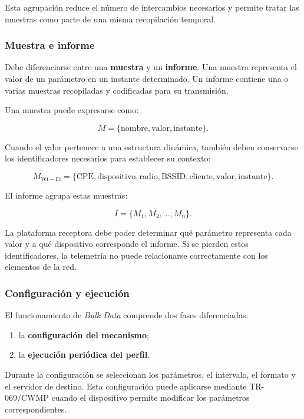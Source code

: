 Esta agrupación reduce el número de intercambios necesarios y permite
tratar las muestras como parte de una misma recopilación temporal.


\subsubsection*{Muestra e informe}

Debe diferenciarse entre una \textbf{muestra} y un
\textbf{informe}. Una muestra representa el valor de un parámetro en un
instante determinado. Un informe contiene una o varias muestras
recopiladas y codificadas para su transmisión.

Una muestra puede expresarse como:

\[
    M =
    \{
        \text{nombre},
        \text{valor},
        \text{instante}
    \}.
\]

Cuando el valor pertenece a una estructura dinámica, también deben
conservarse los identificadores necesarios para establecer su contexto:

\[
    M_{\mathrm{Wi-Fi}} =
    \{
        \text{CPE},
        \text{dispositivo},
        \text{radio},
        \text{BSSID},
        \text{cliente},
        \text{valor},
        \text{instante}
    \}.
\]

El informe agrupa estas muestras:

\[
    I =
    \{
        M_1,
        M_2,
        \ldots,
        M_n
    \}.
\]

La plataforma receptora debe poder determinar qué parámetro representa
cada valor y a qué dispositivo corresponde el informe. Si se pierden
estos identificadores, la telemetría no puede relacionarse correctamente
con los elementos de la red.


\subsubsection*{Configuración y ejecución}

El funcionamiento de \textit{Bulk Data} comprende dos fases
diferenciadas:

\begin{enumerate}
    \item la \textbf{configuración del mecanismo};

    \item la \textbf{ejecución periódica del perfil}.
\end{enumerate}

Durante la configuración se seleccionan los parámetros, el intervalo, el
formato y el servidor de destino. Esta configuración puede aplicarse
mediante TR-069/CWMP cuando el dispositivo permite modificar los
parámetros correspondientes.

